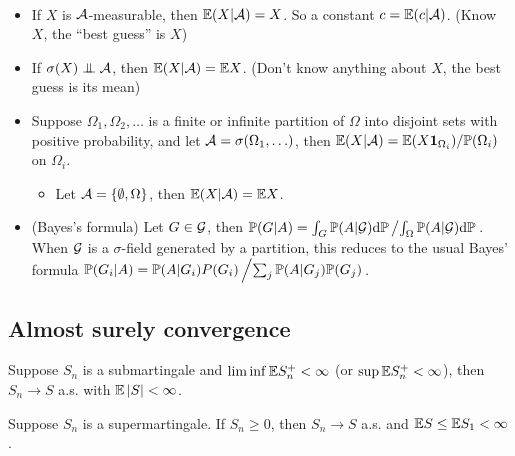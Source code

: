 \documentclass[10pt,a4paper]{article}
\begin{document}
\begin{exbox}
	\begin{example}\label{eg:cond_exp}\rm
		\
		\begin{itemize}
			\item If $X$ is ${\cal A}$-measurable, then $\mathbb E(X|{\cal A})=X$. So a constant $c=\mathbb E(c|{\cal A})$. (Know $X$, the ``best guess'' is $X$)
			\item  If $\sigma(X)\indep \calA$, then $\mathbb E(X|{\cal A})=\mathbb E X$. (Don't know anything about $X$, the best guess is its mean) 
			\item Suppose $\Omega_1,\Omega_2,\ldots$ is a finite or infinite partition of $\Omega$ into disjoint sets with positive probability, and let ${\cal A}=\sigma(\Omega_1,\ldots)$, then $\mathbb E(X|{\cal A})=\mathbb E(X{\boldsymbol 1}_{\Omega_i})/\mathbb P(\Omega_i)$ on $\Omega_i$. 
			\begin{itemize}
				\item Let ${\cal A}=\{\emptyset, \Omega\}$, then $\mathbb E(X|{\cal A})=\mathbb E X$.  
			\end{itemize}   
			\item (Bayes's formula)	Let $G\in{\cal G}$, then $\mathbb P (G|A)=\int_G \mathbb P(A|{\cal G}) \mathrm{d} \mathbb P \left/ \int_\Omega \mathbb P(A|{\cal G}) \mathrm{d} \mathbb P \right.$. When ${\cal G}$ is a $\sigma$-field generated by a partition, this reduces to the usual Bayes' formula $\mathbb P(G_i|A)=\mathbb P(A|G_i)P(G_i)\left/ \sum_j \mathbb P(A|G_j)\mathbb P(G_j)\right.$.
		\end{itemize}
	\end{example}
\end{exbox}



\subsection{Almost surely convergence}\label{sec:martingale_ascvg}
\begin{thmbox}
	\begin{theorem}\label{thm:martingale_cvg}
		Suppose $S_n$ is a submartingale and $\liminf \mathbb E S_n^+<\infty $ (or $\sup \mathbb E S_n^+<\infty $), then $S_n\to S$ a.s. with $\mathbb E\left\lvert S\right\rvert<\infty $.   
	\end{theorem}
	\begin{theorem}\label{thm:martingale_cvg_super}
		Suppose $S_n$ is a supermartingale. If $S_n\geq 0$, then $S_n\to S$ a.s. and $\mathbb E S\leq\mathbb E S_1 <\infty $.    
	\end{theorem}

\end{thmbox}
\end{document}
